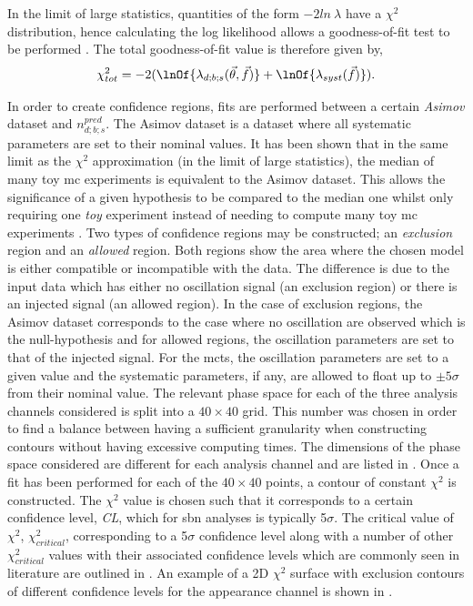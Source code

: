 In the limit of large statistics, quantities of the form $-2ln~\lambda$ have a $\chi^2$ distribution, hence calculating the log likelihood allows a goodness-of-fit test to be performed \cite{introduction_to_mathematical_statistics_book}. The total goodness-of-fit value is therefore given by,
\begin{equation}
    \chi^2_{tot} = -2(\lnOf{\lambda_{d;b;s}(\vec{\theta}, \vec{f})} + \lnOf{\lambda_{syst}(\vec{f})}).
\end{equation}

In order to create confidence regions, fits are performed between a certain \textit{Asimov} dataset and $n_{d;b;s}^{pred}$. The Asimov dataset is a dataset where all systematic parameters are set to their nominal values. It has been shown that in the same limit as the $\chi^2$ approximation (in the limit of large statistics), the median of many toy \gls{mc} experiments is equivalent to the Asimov dataset. This allows the significance of a given hypothesis to be compared to the median one whilst only requiring one \textit{toy} experiment instead of needing to compute many toy \gls{mc} experiments \cite{Asimov_dataset}. Two types of confidence regions may be constructed; an \textit{exclusion} region and an \textit{allowed} region. Both regions show the area where the chosen model is either compatible or incompatible with the data. The difference is due to the input data which has either no oscillation signal (an exclusion region) or there is an injected signal (an allowed region). In the case of exclusion regions, the Asimov dataset corresponds to the case where no oscillation are observed which is the null-hypothesis and for allowed regions, the oscillation parameters are set to that of the injected signal. For the \glspl{mct}, the oscillation parameters are set to a given value and the systematic parameters, if any, are allowed to float up to $\pm5\sigma$ from their nominal value. The relevant phase space for each of the three analysis channels considered is split into a $40 \times 40$ grid. This number was chosen in order to find a balance between having a sufficient granularity when constructing contours without having excessive computing times. The dimensions of the phase space considered are different for each analysis channel and are listed in . Once a fit has been performed for each of the $40 \times 40$ points, a contour of constant $\chi^2$ is constructed. The $\chi^2$ value is chosen such that it corresponds to a certain confidence level, \textit{CL}, which for \gls{sbn} analyses is typically 5$\sigma$. The critical value of $\chi^2$, $\chi^2_{critical}$, corresponding to a 5$\sigma$ confidence level along with a number of other $\chi^2_{critical}$ values with their associated confidence levels which are commonly seen in literature are outlined in . An example of a 2D $\chi^2$ surface with exclusion contours of different confidence levels for the \nue appearance channel is shown in .

